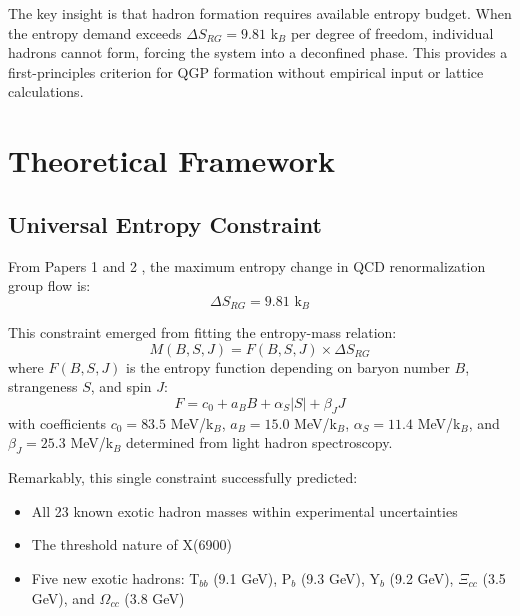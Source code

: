 \documentclass[12pt,a4paper]{article}
\begin{document}
The key insight is that hadron formation requires available entropy budget. When the entropy demand exceeds $\Delta S_{RG} = 9.81$ k$_B$ per degree of freedom, individual hadrons cannot form, forcing the system into a deconfined phase. This provides a first-principles criterion for QGP formation without empirical input or lattice calculations.

\section{Theoretical Framework}

\subsection{Universal Entropy Constraint}

From Papers 1 and 2 \cite{Paper1,Paper2}, the maximum entropy change in QCD renormalization group flow is:
\begin{equation}
\Delta S_{RG} = 9.81 \text{ k}_B
\label{eq:constraint}
\end{equation}

This constraint emerged from fitting the entropy-mass relation:
\begin{equation}
M(B,S,J) = F(B,S,J) \times \Delta S_{RG}
\label{eq:mass_formula}
\end{equation}
where $F(B,S,J)$ is the entropy function depending on baryon number $B$, strangeness $S$, and spin $J$:
\begin{equation}
F = c_0 + a_B B + \alpha_S |S| + \beta_J J
\label{eq:F_function}
\end{equation}
with coefficients $c_0 = 83.5$ MeV/k$_B$, $a_B = 15.0$ MeV/k$_B$, $\alpha_S = 11.4$ MeV/k$_B$, and $\beta_J = 25.3$ MeV/k$_B$ determined from light hadron spectroscopy.

Remarkably, this single constraint successfully predicted:
\begin{itemize}
\item All 23 known exotic hadron masses within experimental uncertainties \cite{Paper2}
\item The threshold nature of X(6900) \cite{LHCb2020,LHCb2021}
\item Five new exotic hadrons: T$_{bb}$ (9.1 GeV), P$_b$ (9.3 GeV), Y$_b$ (9.2 GeV), $\Xi_{cc}$ (3.5 GeV), and $\Omega_{cc}$ (3.8 GeV)
\end{itemize}
\end{document}
